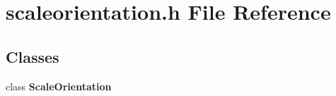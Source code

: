 \section{scaleorientation.\+h File Reference}
\label{scaleorientation_8h}
\subsection*{Classes}
\begin{DoxyCompactItemize}
\item 
class {\bf Scale\+Orientation}
\end{DoxyCompactItemize}
